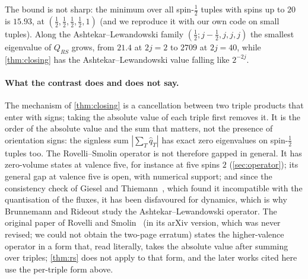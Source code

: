 The bound is not sharp: the minimum over all spin-$\frac12$ tuples with spins up to $20$
is $15.93$, at $(\frac12,\frac12,\frac12,\frac12,1)$ (and we reproduce it with our own code
on small tuples). Along the Ashtekar--Lewandowski family $(\frac12;j-\frac12,j,j,j)$ the
smallest eigenvalue of $Q_{RS}$ grows, from $21.4$ at $2j=2$ to $2709$ at $2j=40$, while
\cref{thm:closing} has the Ashtekar--Lewandowski value falling like $2^{-2j}$.

\paragraph{What the contrast does and does not say.}
The mechanism of \cref{thm:closing} is a cancellation between two triple products that
enter with signs; taking the absolute value of each triple first removes it. It is the
order of the absolute value and the sum that matters, not the presence of orientation
signs: the signless sum $|\sum_T\hat q_T|$ has exact zero eigenvalues on spin-$\frac12$
tuples too. The Rovelli--Smolin operator is not therefore gapped in general. It has
zero-volume states at valence five, for instance at five spins $2$ (\cref{sec:operator});
its general gap at valence five is open, with numerical support; and since the
consistency check of Giesel and Thiemann~\cite{GT2006}, which found it incompatible with
the quantisation of the fluxes, it has been disfavoured for dynamics, which is why
Brunnemann and Rideout study the Ashtekar--Lewandowski operator. The original paper
of Rovelli and Smolin~\cite{RS1995} (in its arXiv version, which was never revised;
we could not obtain the two-page erratum) states the higher-valence operator in a form that, read literally, takes the
absolute value after summing over triples; \cref{thm:rs} does not apply to that form,
and the later works cited here~\cite{DPR1996,AL1998,GT2006,Kis2021} use the per-triple
form above.
